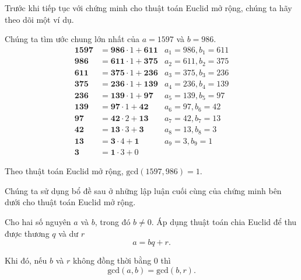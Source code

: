 Trước khi tiếp tục với chứng minh cho thuật toán Euclid mở rộng, chúng ta hãy theo dõi một ví dụ.
\begin{example}
    Chúng ta tìm ước chung lớn nhất của $a = 1597$ và $b = 986$.
    \begin{align*}
        \mathbf{1597} & = \mathbf{986}\cdot 1 + \mathbf{611} & a_{1} = 986, b_{1} = 611 \\
        \mathbf{986}  & = \mathbf{611}\cdot 1 + \mathbf{375} & a_{2} = 611, b_{2} = 375 \\
        \mathbf{611}  & = \mathbf{375}\cdot 1 + \mathbf{236} & a_{3} = 375, b_{3} = 236 \\
        \mathbf{375}  & = \mathbf{236}\cdot 1 + \mathbf{139} & a_{4} = 236, b_{4} = 139 \\
        \mathbf{236}  & = \mathbf{139}\cdot 1 + \mathbf{97}  & a_{5} = 139, b_{5} = 97  \\
        \mathbf{139}  & = \mathbf{97}\cdot 1 + \mathbf{42}   & a_{6} = 97, b_{6} = 42   \\
        \mathbf{97}   & = \mathbf{42}\cdot 2 + \mathbf{13}   & a_{7} = 42, b_{7} = 13   \\
        \mathbf{42}   & = \mathbf{13}\cdot 3 + \mathbf{3}    & a_{8} = 13, b_{8} = 3    \\
        \mathbf{13}   & = \mathbf{3}\cdot 4 + \mathbf{1}     & a_{9} = 3, b_{9} = 1     \\
        \mathbf{3}    & = \mathbf{1}\cdot 3 + 0
    \end{align*}

    Theo thuật toán Euclid mở rộng, $\text{gcd}(1597, 986) = 1$.
\end{example}

Chúng ta sử dụng bổ đề sau ở những lập luận cuối cùng của chứng minh bên dưới cho thuật toán Euclid mở rộng.

\begin{lemma}
    Cho hai số nguyên $a$ và $b$, trong đó $b\ne 0$. Áp dụng thuật toán chia Euclid để thu được thương $q$ và dư $r$
    \[
        a = b q + r.
    \]

    \noindent Khi đó, nếu $b$ và $r$ không đồng thời bằng $0$ thì
    \[
        \text{gcd}(a, b) = \text{gcd}(b, r).
    \]
\end{lemma}

